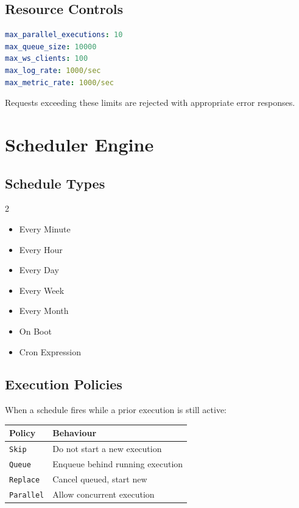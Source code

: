 \documentclass[12pt,a4paper]{article}
\begin{document}
\subsection{Resource Controls}

\begin{lstlisting}[language=yaml, caption={Global resource limits}]
max_parallel_executions: 10
max_queue_size: 10000
max_ws_clients: 100
max_log_rate: 1000/sec
max_metric_rate: 1000/sec
\end{lstlisting}

Requests exceeding these limits are rejected with appropriate error responses.

\section{Scheduler Engine}

\subsection{Schedule Types}

\begin{multicols}{2}
\begin{itemize}[noitemsep,leftmargin=*]
    \item Every Minute
    \item Every Hour
    \item Every Day
    \item Every Week
    \item Every Month
    \item On Boot
    \item Cron Expression
\end{itemize}
\end{multicols}

\subsection{Execution Policies}

When a schedule fires while a prior execution is still active:

\begin{center}
\begin{tabular}{ll}
\toprule
Policy & Behaviour \\
\midrule
\texttt{Skip}     & Do not start a new execution \\
\texttt{Queue}    & Enqueue behind running execution \\
\texttt{Replace}  & Cancel queued, start new \\
\texttt{Parallel} & Allow concurrent execution \\
\bottomrule
\end{tabular}
\end{center}
\end{document}
